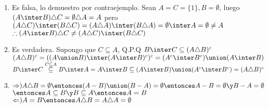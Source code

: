 \begin{enumerate}[label=\roman*)]
\item Es falsa, lo demuestro por contraejemplo. Sean $A = C = \{1\}, B = \emptyset$, luego \\
$(A \inter B) \triangle C = \emptyset \triangle A = A$ pero \\
$(A \triangle C) \inter (B \triangle C) = (A \triangle A) \inter (B \triangle A) = \emptyset \inter A = \emptyset \neq A$ \\
$\therefore (A \inter B) \triangle C \neq (A \triangle C) \inter (B \triangle C)$
\item Es verdadera. Supongo que $C \subseteq A$, Q.P.Q $B \inter C \subseteq (A \triangle B)^c$ \\
$(A \triangle B)^c = ((A \union B) \inter (A \inter B)^c)^c = (A^c \inter B^c) \union (A \inter B)$ \\
$B \inter C \stackrel{C \subseteq A}{\subseteq} B \inter A = A \inter B \subseteq (A \inter B) \union (A^c \inter B^c) = (A \triangle B)^c$
\item $\text{$\Rightarrow$)} A \triangle B = \emptyset \entonces (A - B) \union (B - A) = \emptyset \entonces A - B = \emptyset \y B - A = \emptyset$ 
$\entonces A \subseteq B \y B \subseteq A \entonces A = B$ \\
$\text{$\Leftarrow$)} A = B \entonces A \triangle B = A \triangle A = \emptyset$
\end{enumerate}

